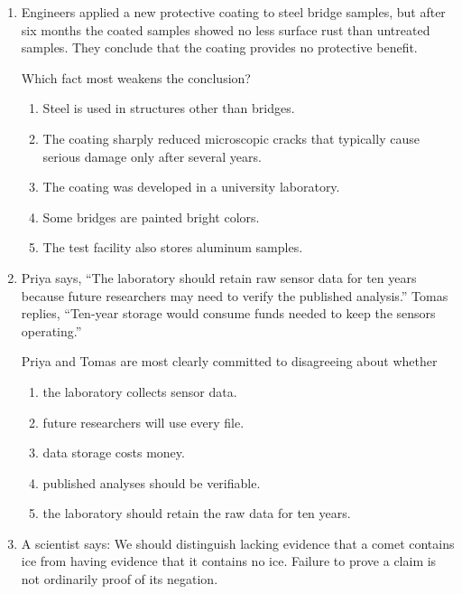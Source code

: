 \begin{enumerate}
\item Engineers applied a new protective coating to steel bridge samples, but after six months the coated samples showed no less surface rust than untreated samples. They conclude that the coating provides no protective benefit.

Which fact most weakens the conclusion?
\begin{enumerate}
\item[(A)] Steel is used in structures other than bridges.
\item[(B)] The coating sharply reduced microscopic cracks that typically cause serious damage only after several years.
\item[(C)] The coating was developed in a university laboratory.
\item[(D)] Some bridges are painted bright colors.
\item[(E)] The test facility also stores aluminum samples.
\end{enumerate}

\item Priya says, ``The laboratory should retain raw sensor data for ten years because future researchers may need to verify the published analysis.'' Tomas replies, ``Ten-year storage would consume funds needed to keep the sensors operating.''

Priya and Tomas are most clearly committed to disagreeing about whether
\begin{enumerate}
\item[(A)] the laboratory collects sensor data.
\item[(B)] future researchers will use every file.
\item[(C)] data storage costs money.
\item[(D)] published analyses should be verifiable.
\item[(E)] the laboratory should retain the raw data for ten years.
\end{enumerate}

\item A scientist says: We should distinguish lacking evidence that a comet contains ice from having evidence that it contains no ice. Failure to prove a claim is not ordinarily proof of its negation.


\end{enumerate}
